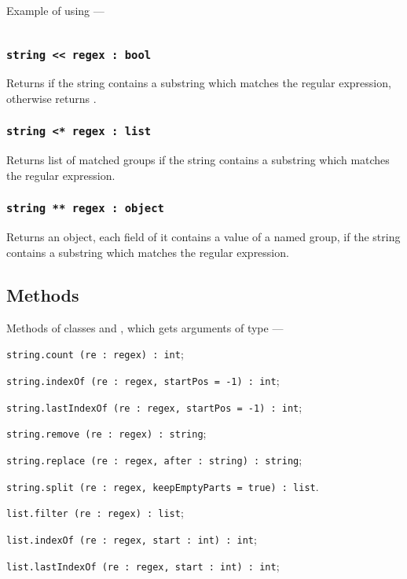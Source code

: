 Example of using —
\inputminted[linenos]{icl}{../sources/regexpopsex.icL}

\subsubsection{\texttt{string << regex : bool}}

Returns \true{} if the string contains a substring which matches the regular expression, otherwise returns \false.

\subsubsection{\texttt{string <* regex : list}}

Returns list of matched groups if the string contains a substring which matches the regular expression.

\subsubsection{\texttt{string ** regex : object}}

Returns an object, each field of it contains a value of a named group, if the string contains a substring which matches the regular expression.

\subsection{Methods}

Methods of classes \str{} and \listtype, which gets arguments of type \regex{} —
\begin{icItems}
\item
\texttt{string.count (re : regex) : int};
\item
\texttt{string.indexOf (re : regex, startPos = -1) : int};
\item
\texttt{string.lastIndexOf (re : regex, startPos = -1) : int};
\item
\texttt{string.remove (re : regex) : string};
\item 
\texttt{string.replace (re : regex, after : string) : string};
\item
\texttt{string.split (re : regex, keepEmptyParts = true) : list}.
\item
\texttt{list.filter (re : regex) : list};
\item
\texttt{list.indexOf (re : regex, start : int) : int};
\item
\texttt{list.lastIndexOf (re : regex, start : int) : int};
\end{icItems}

